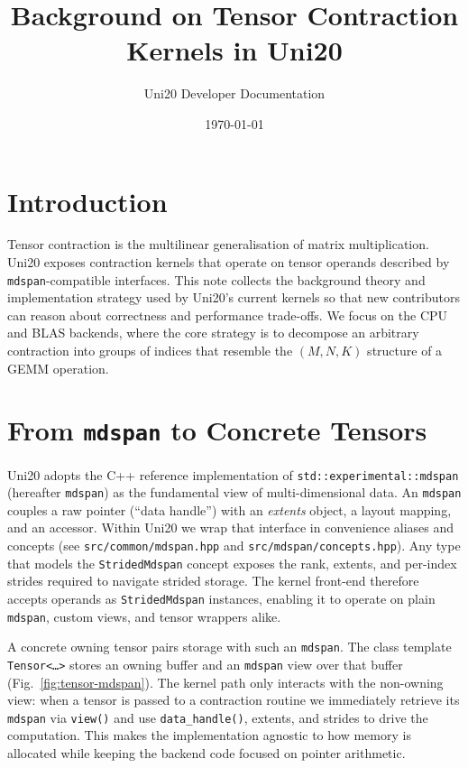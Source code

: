 \documentclass[11pt]{article}
\title{Background on Tensor Contraction Kernels in Uni20}
\author{Uni20 Developer Documentation}
\date{\today}
\begin{document}
\maketitle

\section{Introduction}
Tensor contraction is the multilinear generalisation of matrix multiplication.  Uni20 exposes
contraction kernels that operate on tensor operands described by \texttt{mdspan}-compatible
interfaces.  This note collects the background theory and implementation strategy used by Uni20's
current kernels so that new contributors can reason about correctness and performance trade-offs.
We focus on the CPU and BLAS backends, where the core strategy is to decompose an arbitrary
contraction into groups of indices that resemble the \((M,N,K)\) structure of a GEMM operation.

\section{From \texttt{mdspan} to Concrete Tensors}
Uni20 adopts the C++ reference implementation of \texttt{std::experimental::mdspan} (hereafter
\texttt{mdspan}) as the fundamental view of multi-dimensional data.  An \texttt{mdspan} couples a
raw pointer (``data handle'') with an \emph{extents} object, a layout mapping, and an accessor.
Within Uni20 we wrap that interface in convenience aliases and concepts (see
\texttt{src/common/mdspan.hpp} and \texttt{src/mdspan/concepts.hpp}).  Any type that models the
\texttt{StridedMdspan} concept exposes the rank, extents, and per-index strides required to navigate
strided storage.  The kernel front-end therefore accepts operands as \texttt{StridedMdspan}
instances, enabling it to operate on plain \texttt{mdspan}, custom views, and tensor wrappers alike.

A concrete owning tensor pairs storage with such an \texttt{mdspan}.  The class template
\texttt{Tensor<\ldots>} stores an owning buffer and an \texttt{mdspan} view over that buffer
(Fig.~\ref{fig:tensor-mdspan}).  The kernel path only interacts with the non-owning view: when a
tensor is passed to a contraction routine we immediately retrieve its \texttt{mdspan} via
\texttt{view()} and use \texttt{data\_handle()}, extents, and strides to drive the computation.
This makes the implementation agnostic to how memory is allocated while keeping the backend code
focused on pointer arithmetic.
\end{document}
